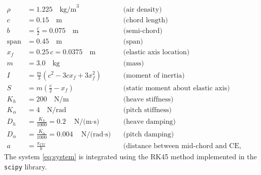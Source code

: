 \documentclass[a4paper,12pt]{article}
\begin{document}
\begin{align*}
\rho       &= 1.225 \quad \text{kg/m}^3 && \text{(air density)} \\
c          &= 0.15 \quad \text{m}       && \text{(chord length)} \\
b          &= \frac{c}{2} = 0.075 \quad \text{m} && \text{(semi-chord)} \\
\text{span} &= 0.45 \quad \text{m}      && \text{(span)} \\
x_f        &= 0.25\,c = 0.0375 \quad \text{m} && \text{(elastic axis location)} \\
m          &= 3.0 \quad \text{kg}       && \text{(mass)} \\
I          &= \frac{m}{3}\left(c^2 - 3c x_f + 3x_f^2\right) && \text{(moment of inertia)} \\
S          &= m\left(\frac{c}{2} - x_f\right) && \text{(static moment about elastic axis)} \\
K_h        &= 200 \quad \text{N/m}      && \text{(heave stiffness)} \\
K_\alpha   &= 4 \quad \text{N/rad}      && \text{(pitch stiffness)} \\
D_h        &= \frac{K_h}{1000} = 0.2 \quad \text{N/(m$\cdot$s)} && \text{(heave damping)} \\
D_\alpha   &= \frac{K_\alpha}{1000} = 0.004 \quad \text{N/(rad$\cdot$s)} && \text{(pitch damping)} \\
a          &= \frac{x_{CG}}{b} && \text{(distance between mid-chord and CE, nondimensional).}
\end{align*}
The system \ref{eq:system} is integrated using the RK45 method implemented in the \texttt{scipy} library.
\end{document}
